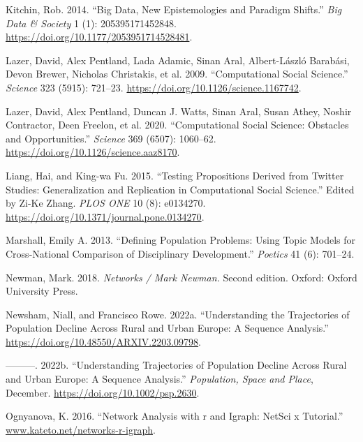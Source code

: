 \documentclass[
  letterpaper,
  DIV=11,
  numbers=noendperiod]{scrreprt}
\newlength{\cslhangindent}
\newlength{\cslentryspacingunit} %
\newenvironment{CSLReferences}[2] %
 {%
  \setlength{\parindent}{0pt}
  \ifodd #1
  \let\oldpar\par
  \def\par{\hangindent=\cslhangindent\oldpar}
  \fi
  \setlength{\parskip}{#2\cslentryspacingunit}
 }%
 {}
\begin{document}
\begin{CSLReferences}{1}{0}
\leavevmode{}%
Kitchin, Rob. 2014. {``Big Data, New Epistemologies and Paradigm
Shifts.''} \emph{Big Data \& Society} 1 (1): 205395171452848.
\url{https://doi.org/10.1177/2053951714528481}.

\leavevmode{}%
Lazer, David, Alex Pentland, Lada Adamic, Sinan Aral, Albert-László
Barabási, Devon Brewer, Nicholas Christakis, et al. 2009.
{``Computational Social Science.''} \emph{Science} 323 (5915): 721--23.
\url{https://doi.org/10.1126/science.1167742}.

\leavevmode{}%
Lazer, David, Alex Pentland, Duncan J. Watts, Sinan Aral, Susan Athey,
Noshir Contractor, Deen Freelon, et al. 2020. {``Computational Social
Science: Obstacles and Opportunities.''} \emph{Science} 369 (6507):
1060--62. \url{https://doi.org/10.1126/science.aaz8170}.

\leavevmode{}%
Liang, Hai, and King-wa Fu. 2015. {``Testing Propositions Derived from
Twitter Studies: Generalization and Replication in Computational Social
Science.''} Edited by Zi-Ke Zhang. \emph{PLOS ONE} 10 (8): e0134270.
\url{https://doi.org/10.1371/journal.pone.0134270}.

\leavevmode{}%
Marshall, Emily A. 2013. {``Defining Population Problems: Using Topic
Models for Cross-National Comparison of Disciplinary Development.''}
\emph{Poetics} 41 (6): 701--24.

\leavevmode{}%
Newman, Mark. 2018. \emph{Networks / Mark Newman.} Second edition.
Oxford: Oxford University Press.

\leavevmode{}%
Newsham, Niall, and Francisco Rowe. 2022a. {``Understanding the
Trajectories of Population Decline Across Rural and Urban Europe: A
Sequence Analysis.''} \url{https://doi.org/10.48550/ARXIV.2203.09798}.

\leavevmode{}%
---------. 2022b. {``Understanding Trajectories of Population Decline
Across Rural and Urban Europe: A Sequence Analysis.''} \emph{Population,
Space and Place}, December. \url{https://doi.org/10.1002/psp.2630}.

\leavevmode{}%
Ognyanova, K. 2016. {``Network Analysis with r and Igraph: NetSci x
Tutorial.''}
\href{https://www.kateto.net/networks-r-igraph}{www.kateto.net/networks-r-igraph}.


\end{CSLReferences}
\end{document}
